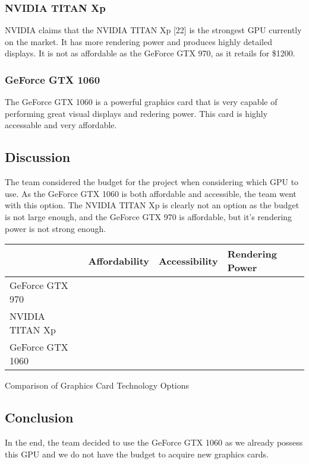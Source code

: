 \documentclass[letterpaper,10pt,onecolumn,compsoc]{IEEEtran}
\begin{document}
\subsubsection{NVIDIA TITAN Xp}
NVIDIA claims that the NVIDIA TITAN Xp [22] is the strongest GPU currently on the market. It has more rendering power and produces highly detailed displays. It is not as affordable as the GeForce GTX 970, as it retails for \$1200.

\subsubsection{GeForce GTX 1060}
The GeForce GTX 1060 is a powerful graphics card that is very capable of performing great visual displays and redering power. This card is highly accessable and very affordable. 

\subsection{Discussion}
The team considered the budget for the project when considering which GPU to use. As the GeForce GTX 1060 is both affordable and accessible, the team went with this option. The NVIDIA TITAN Xp is clearly not an option as the budget is not large enough, and the GeForce GTX 970 is affordable, but it’s rendering power is not strong enough.


\begin{center}
\begin{tabular}{ | P{4.5cm} | P{3cm} | P{2.5cm} | P{3.5cm} | } 
 	\hline
 	 & Affordability & Accessibility & Rendering Power \\ 
 	\hline
 	GeForce GTX 970 & \checkmark & \checkmark &  \\ 
 	\hline
 	NVIDIA TITAN Xp & & & \checkmark \\ 
 	\hline
 	GeForce GTX 1060 & \checkmark & \checkmark & \checkmark \\ 
 	\hline
\end{tabular}
\end{center}

\begin{center}
Comparison of Graphics Card Technology Options
\end{center}

\subsection{Conclusion}
In the end, the team decided to use the GeForce GTX 1060 as we already possess this GPU and we do not have the budget to acquire new graphics cards.
\end{document}

